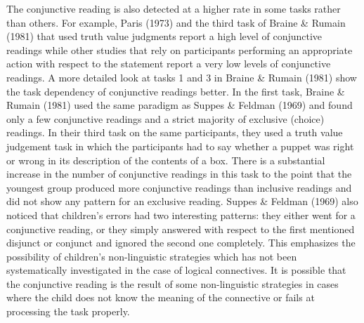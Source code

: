 \documentclass[oneside]{report}
\theoremstyle{definition}
\theoremstyle{definition}
\theoremstyle{definition}
\theoremstyle{remark}
\begin{document}
The conjunctive reading is also detected at a higher rate in some tasks
rather than others. For example, Paris (1973) and the third task of
Braine \& Rumain (1981) that used truth value judgments report a high
level of conjunctive readings while other studies that rely on
participants performing an appropriate action with respect to the
statement report a very low levels of conjunctive readings. A more
detailed look at tasks 1 and 3 in Braine \& Rumain (1981) show the task
dependency of conjunctive readings better. In the first task, Braine \&
Rumain (1981) used the same paradigm as Suppes \& Feldman (1969) and
found only a few conjunctive readings and a strict majority of exclusive
(choice) readings. In their third task on the same participants, they
used a truth value judgement task in which the participants had to say
whether a puppet was right or wrong in its description of the contents
of a box. There is a substantial increase in the number of conjunctive
readings in this task to the point that the youngest group produced more
conjunctive readings than inclusive readings and did not show any
pattern for an exclusive reading. Suppes \& Feldman (1969) also noticed
that children's errors had two interesting patterns: they either went
for a conjunctive reading, or they simply answered with respect to the
first mentioned disjunct or conjunct and ignored the second one
completely. This emphasizes the possibility of children's non-linguistic
strategies which has not been systematically investigated in the case of
logical connectives. It is possible that the conjunctive reading is the
result of some non-linguistic strategies in cases where the child does
not know the meaning of the connective or fails at processing the task
properly.
\end{document}
